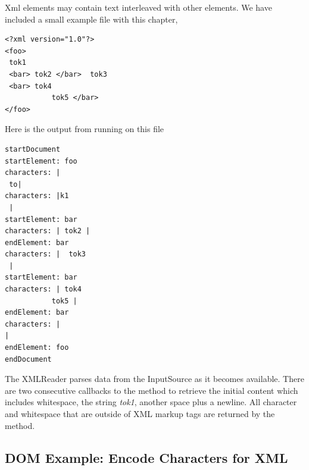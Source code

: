 Xml elements may contain text interleaved with other elements.
We have included a small example file with this chapter,
%
\begin{verbatim}
<?xml version="1.0"?>
<foo> 
 tok1 
 <bar> tok2 </bar>  tok3 
 <bar> tok4 
           tok5 </bar>
</foo>
\end{verbatim} 
Here is the output from running  on this file
\begin{verbatim} 
startDocument
startElement: foo
characters: | 
 to|
characters: |k1 
 |
startElement: bar
characters: | tok2 |
endElement: bar
characters: |  tok3 
 |
startElement: bar
characters: | tok4 
           tok5 |
endElement: bar
characters: |
|
endElement: foo
endDocument
\end{verbatim}
The XMLReader parses data from the InputSource as it becomes available.
There are two consecutive callbacks to the  method to
retrieve the initial content which includes whitespace, the string \emph{tok1},
another space plus a newline.
All character and whitespace that are outside of XML markup tags are returned
by the  method.

\subsection{DOM Example: Encode Characters for XML}

